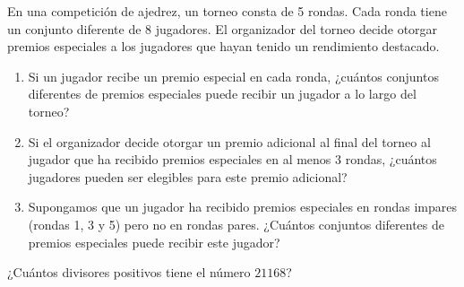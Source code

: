 \documentclass[letterpaper,12pt]{article}
\begin{document}
\begin{problema}[7 puntos]
    En una competición de ajedrez, un torneo consta de 5 rondas. Cada ronda tiene un conjunto diferente de 8 jugadores. El organizador del torneo decide otorgar premios especiales a los jugadores que hayan tenido un rendimiento destacado.
    \begin{enumerate}
        \item Si un jugador recibe un premio especial en cada ronda, ¿cuántos conjuntos diferentes de premios especiales puede recibir un jugador a lo largo del torneo?
        \item Si el organizador decide otorgar un premio adicional al final del torneo al jugador que ha recibido premios especiales en al menos $3$ rondas, ¿cuántos jugadores pueden ser elegibles para este premio adicional?
        \item Supongamos que un jugador ha recibido premios especiales en rondas impares (rondas 1, 3 y 5) pero no en rondas pares. ¿Cuántos conjuntos diferentes de premios especiales puede recibir este jugador?
    \end{enumerate}
\end{problema}

\begin{credito}[1 punto]
    ¿Cuántos divisores positivos tiene el número $21168$?
\end{credito}
\end{document}
